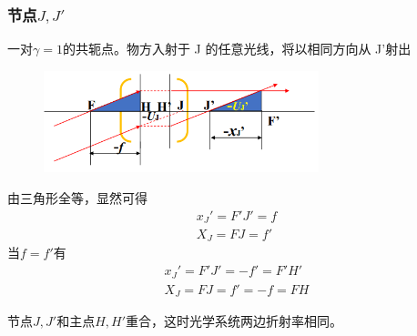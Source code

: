 \subsubsection{节点$J,J'$}
一对$\gamma=1$的共轭点。物方入射于 J 的任意光线，将以相同方向从 J’射出
        \begin{figure}[H]
            \centering
            \includegraphics[width=8cm]{img/3.2.png}
            \end{figure}
由三角形全等，显然可得
\begin{align}
    x_J'={F'J'}=f \tag{3.2.4.a} \\
    X_J=FJ=f' \tag{3.2.4.b}
 \end{align}
当$f=f'$有
\begin{align}
    x_J'={F'J'}=-f'=F'H' \tag{3.2.4.a} \\
    X_J=FJ=f'=-f=FH \tag{3.2.4.b}
 \end{align}

节点$J,J'$和主点$H,H'$重合，这时光学系统两边折射率相同。

